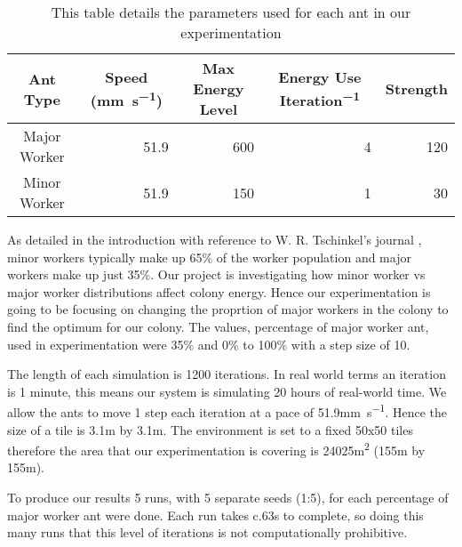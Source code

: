 \begin{table}[htb]
  \centering
  \caption{This table details the parameters used for each ant in our experimentation}
  \label{tab:ant-parameters}
  \begin{tabular}{@{}crrrr@{}}
  \toprule
  Ant Type     & \multicolumn{1}{c}{Speed (\si{mm.s^{-1}})} & \multicolumn{1}{c}{Max Energy Level} & \multicolumn{1}{c}{Energy Use \si{Iteration^{-1}}} & \multicolumn{1}{c}{Strength} \\ \midrule
  Major Worker & 51.9                             &  600                                    & 4     & 120                                    \\ \midrule
  Minor Worker & 51.9                              & 150                                     & 1    & 30                                     \\ \bottomrule
  \end{tabular}
\end{table}

As detailed in the introduction with reference to W. R. Tschinkel's journal \cite{Tschinkel1988}, minor workers typically make up 65\% of the worker population and major workers make up just 35\%. Our project is investigating how minor worker vs major worker distributions affect colony energy. Hence our experimentation is going to be focusing on changing the proprtion of major workers in the colony to find the optimum for our colony. The values, percentage of major worker ant, used in experimentation were 35\% and 0\% to 100\% with a step size of 10.\par
 The length of each simulation is 1200 iterations. In real world terms an iteration is 1 minute, this means our system is simulating 20 hours of real-world time. We allow the ants to move 1 step each iteration at a pace of 51.9\si{mm.s^{-1}}. Hence the size of a tile is 3.1\si{m} by 3.1\si{m}. The environment is set to a fixed 50x50 tiles therefore the area that our experimentation is covering is 24025\si{m^2} (155\si{m} by 155\si{m}).\par
 To produce our results 5 runs, with 5 separate seeds (1:5), for each percentage of major worker ant were done. Each run takes c.63\si{s} to complete, so doing this many runs that this level of iterations is not computationally prohibitive.\par

